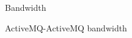 \documentclass{thesis}
\begin{document}
\begin{figure}[tb] 
\centering
\caption{Bandwidth}
\label{fig:bandwidth}
\end{figure}

\begin{figure}[tb] 
\centering
\caption{ActiveMQ-ActiveMQ bandwidth}
\label{fig:activemq-activemq-bandwidth}
\end{figure}
\end{document}

